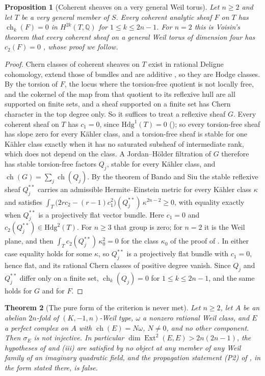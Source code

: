\documentclass[11pt,reqno]{amsart}
\theoremstyle{plain}
\newtheorem{theorem}{Theorem}[section]
\newtheorem{proposition}[theorem]{Proposition}
\theoremstyle{definition}
\theoremstyle{remark}
\newcommand{\QQ}{\mathbb{Q}}
\newcommand{\Hdg}{\mathrm{Hdg}}
\DeclareMathOperator{\ch}{ch}
\DeclareMathOperator{\Ext}{Ext}
\begin{document}
\begin{proposition}[Coherent sheaves on a very general Weil torus]
\label{prop:weiltorussheaves}
Let $n\ge2$ and let $T$ be a very general member of $S$. Every coherent
analytic sheaf $F$ on $T$ has $\ch_{k}(F)=0$ in $H^{2k}(T,\QQ)$ for
$1\le k\le2n-1$. For $n=2$ this is Voisin's theorem that every coherent sheaf
on a general Weil torus of dimension four has $c_{2}(F)=0$
\cite[Theorem~10]{Voi02b}, whose proof we follow.
\end{proposition}

\begin{proof}
Chern classes of coherent sheaves on $T$ exist in rational Deligne
cohomology, extend those of bundles and are additive \cite{Gri10}, so they
are Hodge classes. By  the torsion of $F$, the locus where the
torsion-free quotient is not locally free, and the cokernel of the map from
that quotient to its reflexive hull are all supported on finite sets, and a
sheaf supported on a finite set has Chern character in the top degree only. So
it suffices to treat a reflexive sheaf $G$. Every coherent sheaf on $T$ has
$c_{1}=0$, since $\Hdg^{1}(T)=0$ (); so every
torsion-free sheaf has slope zero for every K\"ahler class, and a torsion-free
sheaf is stable for one K\"ahler class exactly when it has no saturated
subsheaf of intermediate rank, which does not depend on the class. A
Jordan--H\"older filtration of $G$ therefore has stable torsion-free factors
$Q_{j}$, stable for every K\"ahler class, and $\ch(G)=\sum_{j}\ch(Q_{j})$.
By the theorem of Bando and Siu \cite{BS94} the stable reflexive sheaf
$Q_{j}^{**}$ carries an admissible Hermite--Einstein metric for every K\"ahler
class $\kappa$ and satisfies
$\int_{T}\bigl(2rc_{2}-(r-1)c_{1}^{2}\bigr)(Q_{j}^{**})\,\kappa^{2n-2}\ge0$,
with equality exactly when $Q_{j}^{**}$ is a projectively flat vector bundle.
Here $c_{1}=0$ and $c_{2}(Q_{j}^{**})\in\Hdg^{2}(T)$. For $n\ge3$ that group is
zero; for $n=2$ it is the Weil plane, and then
$\int_{T}c_{2}(Q_{j}^{**})\,\kappa_{0}^{2}=0$ for the class $\kappa_{0}$ of
the proof of . In either case equality holds for
some $\kappa$, so $Q_{j}^{**}$ is a projectively flat bundle with $c_{1}=0$,
hence flat, and its rational Chern classes of positive degree vanish. Since
$Q_{j}$ and $Q_{j}^{**}$ differ only on a finite set, $\ch_{k}(Q_{j})=0$ for
$1\le k\le2n-1$, and the same holds for $G$ and for $F$.
\end{proof}

\begin{theorem}[The pure form of the criterion is never met]
\label{thm:p2false}
Let $n\ge2$, let $A$ be an abelian $2n$-fold of $(K,-1,n)$-Weil type, $\omega$
a nonzero rational Weil class, and $E$ a perfect complex on $A$ with
$\ch(E)=N\omega$, $N\ne0$, and no other component. Then $\sigma_{E}$ is not
injective. In particular $\dim\Ext^{2}(E,E)>2n(2n-1)$, the hypotheses of
 and (iii) are satisfied by no
object at any member of any Weil family of an imaginary quadratic field, and
the propagation statement \textup{(P2)} of , in the form
stated there, is false.
\end{theorem}
\end{document}
